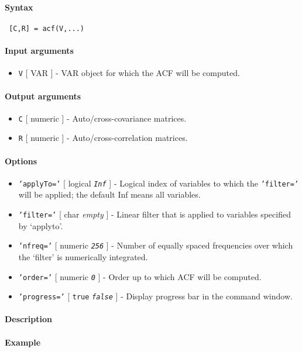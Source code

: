 


	\paragraph{Syntax}
 
 \begin{verbatim}
 [C,R] = acf(V,...)
 \end{verbatim}
 
 \paragraph{Input arguments}
 
 \begin{itemize}
 \item
   \texttt{V} {[} VAR {]} - VAR object for which the ACF will be
   computed.
 \end{itemize}
 
 \paragraph{Output arguments}
 
 \begin{itemize}
 \item
   \texttt{C} {[} numeric {]} - Auto/cross-covariance matrices.
 \item
   \texttt{R} {[} numeric {]} - Auto/cross-correlation matrices.
 \end{itemize}
 
 \paragraph{Options}
 
 \begin{itemize}
 \item
   \texttt{'applyTo='} {[} logical \textbar{} \emph{\texttt{Inf}} {]} -
   Logical index of variables to which the \texttt{'filter='} will be
   applied; the default Inf means all variables.
 \item
   \texttt{'filter='} {[} char \textbar{} \emph{empty} {]} - Linear
   filter that is applied to variables specified by `applyto'.
 \item
   \texttt{'nfreq='} {[} numeric \textbar{} \emph{\texttt{256}} {]} -
   Number of equally spaced frequencies over which the `filter' is
   numerically integrated.
 \item
   \texttt{'order='} {[} numeric \textbar{} \emph{\texttt{0}} {]} - Order
   up to which ACF will be computed.
 \item
   \texttt{'progress='} {[} \texttt{true} \textbar{}
   \emph{\texttt{false}} {]} - Display progress bar in the command
   window.
 \end{itemize}
 
 \paragraph{Description}
 
 \paragraph{Example}



